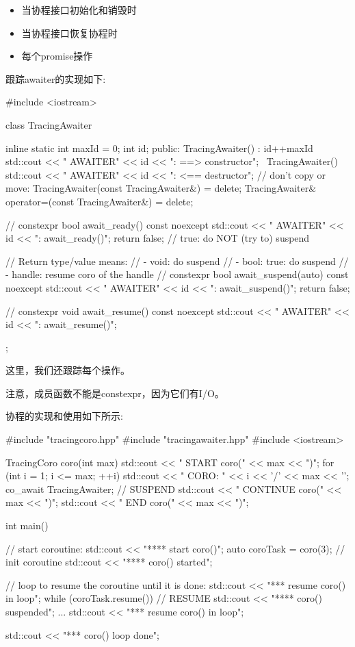 \begin{itemize}
\item 
当协程接口初始化和销毁时

\item 
当协程接口恢复协程时

\item 
每个promise操作
\end{itemize}

跟踪awaiter的实现如下:


\begin{cpp}
#include <iostream>

class TracingAwaiter {
	inline static int maxId = 0;
	int id;
	public:
	TracingAwaiter() : id{++maxId} {
		std::cout << " AWAITER" << id << ": ==> constructor\n";
	}
	~TracingAwaiter() {
		std::cout << " AWAITER" << id << ": <== destructor\n";
	}
	// don’t copy or move:
	TracingAwaiter(const TracingAwaiter&) = delete;
	TracingAwaiter& operator=(const TracingAwaiter&) = delete;
	
	// constexpr
	bool await_ready() const noexcept {
		std::cout << " AWAITER" << id << ": await_ready()\n";
		return false; // true: do NOT (try to) suspend
	}
	
	// Return type/value means:
	// - void: do suspend
	// - bool: true: do suspend
	// - handle: resume coro of the handle
	// constexpr
	bool await_suspend(auto) const noexcept {
		std::cout << " AWAITER" << id << ": await_suspend()\n";
		return false;
	}
	
	// constexpr
	void await_resume() const noexcept {
		std::cout << " AWAITER" << id << ": await_resume()\n";
	}
};
\end{cpp}

这里，我们还跟踪每个操作。

注意，成员函数不能是constexpr，因为它们有I/O。

协程的实现和使用如下所示:


\begin{cpp}
#include "tracingcoro.hpp"
#include "tracingawaiter.hpp"
#include <iostream>

TracingCoro coro(int max)
{
	std::cout << " START coro(" << max << ")\n";
	for (int i = 1; i <= max; ++i) {
		std::cout << "  CORO: " << i << '/' << max << '\n';
		co_await TracingAwaiter{}; // SUSPEND
		std::cout << "   CONTINUE coro(" << max << ")\n";
	}
	std::cout << "  END coro(" << max << ")\n";
}

int main()
{
	// start coroutine:
	std::cout << "**** start coro()\n";
	auto coroTask = coro(3); // init coroutine
	std::cout << "**** coro() started\n";
	
	// loop to resume the coroutine until it is done:
	std::cout << "\n**** resume coro() in loop\n";
	while (coroTask.resume()) { // RESUME
		std::cout << "**** coro() suspended\n";
		...
		std::cout << "\n**** resume coro() in loop\n";
	}
	
	std::cout << "\n**** coro() loop done\n";
}
\end{cpp}

